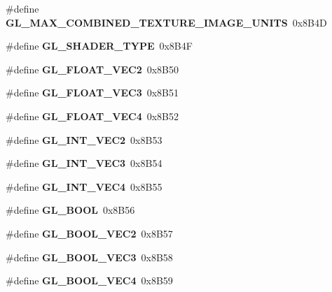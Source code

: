 \begin{DoxyCompactItemize}
\item 
\#define {\bfseries G\+L\+\_\+\+M\+A\+X\+\_\+\+C\+O\+M\+B\+I\+N\+E\+D\+\_\+\+T\+E\+X\+T\+U\+R\+E\+\_\+\+I\+M\+A\+G\+E\+\_\+\+U\+N\+I\+T\+S}~0x8\+B4\+D\label{_s_d_l__opengl_8h_a97d4815b832e756dc3841617c5f4540e}

\item 
\#define {\bfseries G\+L\+\_\+\+S\+H\+A\+D\+E\+R\+\_\+\+T\+Y\+P\+E}~0x8\+B4\+F\label{_s_d_l__opengl_8h_aa4589f80c92f427cc4ed462223e28850}

\item 
\#define {\bfseries G\+L\+\_\+\+F\+L\+O\+A\+T\+\_\+\+V\+E\+C2}~0x8\+B50\label{_s_d_l__opengl_8h_ae32c545990d8412e8a8246632df99824}

\item 
\#define {\bfseries G\+L\+\_\+\+F\+L\+O\+A\+T\+\_\+\+V\+E\+C3}~0x8\+B51\label{_s_d_l__opengl_8h_a3bd312b25bbe841d5231ad69c4a0541a}

\item 
\#define {\bfseries G\+L\+\_\+\+F\+L\+O\+A\+T\+\_\+\+V\+E\+C4}~0x8\+B52\label{_s_d_l__opengl_8h_a696cfaceb3256bf19e990e46702fe527}

\item 
\#define {\bfseries G\+L\+\_\+\+I\+N\+T\+\_\+\+V\+E\+C2}~0x8\+B53\label{_s_d_l__opengl_8h_a2e72a47b144427174af2d6d87a7ab073}

\item 
\#define {\bfseries G\+L\+\_\+\+I\+N\+T\+\_\+\+V\+E\+C3}~0x8\+B54\label{_s_d_l__opengl_8h_a08b6c6a8259ac4ad9ad5d8e7c3d13bb1}

\item 
\#define {\bfseries G\+L\+\_\+\+I\+N\+T\+\_\+\+V\+E\+C4}~0x8\+B55\label{_s_d_l__opengl_8h_ae3fd6dab6e2260ce7fa4cdccbcfba0fb}

\item 
\#define {\bfseries G\+L\+\_\+\+B\+O\+O\+L}~0x8\+B56\label{_s_d_l__opengl_8h_a43c7205c5f4dc7a535bd32817766e272}

\item 
\#define {\bfseries G\+L\+\_\+\+B\+O\+O\+L\+\_\+\+V\+E\+C2}~0x8\+B57\label{_s_d_l__opengl_8h_a40a09ccdfe230775cf871b10f4361183}

\item 
\#define {\bfseries G\+L\+\_\+\+B\+O\+O\+L\+\_\+\+V\+E\+C3}~0x8\+B58\label{_s_d_l__opengl_8h_a0c51fbe743a6c9da5d2f7ac4306b66df}

\item 
\#define {\bfseries G\+L\+\_\+\+B\+O\+O\+L\+\_\+\+V\+E\+C4}~0x8\+B59\label{_s_d_l__opengl_8h_a1985184535af747c30a8a12481e2ffd9}


\end{DoxyCompactItemize}
